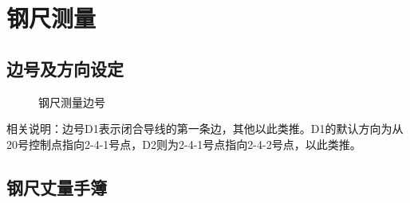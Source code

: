 \documentclass[UTF8]{ctexart}
\begin{document}
\section{钢尺测量}
	\subsection{边号及方向设定}
		\begin{figure}[H]
		\caption{钢尺测量边号}
		\end{figure}
	相关说明：边号D1表示闭合导线的第一条边，其他以此类推。D1的默认方向为从20号控制点指向2-4-1号点，D2则为2-4-1号点指向2-4-2号点，以此类推。
	\subsection{钢尺丈量手簿}
\end{document}
